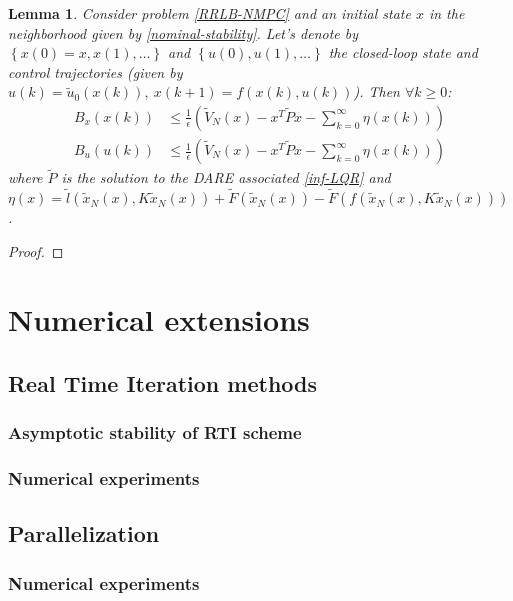 \documentclass[12pt]{article}
\newtheorem{lemma}[theorem]{Lemma}
\theoremstyle{definition}
\newtheorem{definition}[theorem]{Definition}
\theoremstyle{remark}
\begin{document}

\begin{lemma}
	Consider problem \ref{RRLB-NMPC} and an initial state $x$ in the neighborhood given by \ref{nominal-stability}.
	Let's denote by $\left\{x(0)=x,x(1),\dots\right\}$ and $\left\{u(0), u(1),\dots\right\}$ the closed-loop state and control trajectories (given by $u(k)=\tilde{u}_0(x(k)),~x(k+1)=f(x(k),u(k))$).
	Then $\forall k\geq 0$:
	\begin{align*}
		B_x(x(k))&\leq\frac{1}{\epsilon}\left(\tilde{V}_N(x)-x^T\tilde{P}x-\sum_{k=0}^\infty\eta(x(k))\right)\\
		B_u(u(k))&\leq\frac{1}{\epsilon}\left(\tilde{V}_N(x)-x^T\tilde{P}x-\sum_{k=0}^\infty\eta(x(k))\right)
	\end{align*}
	where $\tilde{P}$ is the solution to the DARE associated \ref{inf-LQR} and $\eta(x)=\tilde{l}(\tilde{x}_N(x),K\tilde{x}_N(x))+\tilde{F}(\tilde{x}_N(x))-\tilde{F}(f(\tilde{x}_N(x), K\tilde{x}_N(x)))$.
\end{lemma}

\begin{proof}
	
\end{proof}

\section{Numerical extensions}

\subsection{Real Time Iteration methods}
\subsubsection{Asymptotic stability of RTI scheme}
\subsubsection{Numerical experiments}

\subsection{Parallelization}
\subsubsection{Numerical experiments}
\end{document}

